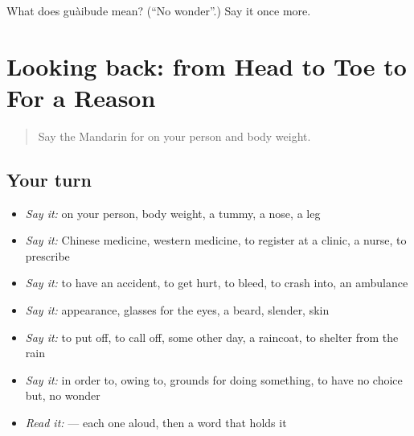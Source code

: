 \begin{tcolorbox}[breakable,colback=teal!4,colframe=teal!35!black,title={Before you move on}]
What does guàibude mean? (\textquotedblleft{}No wonder\textquotedblright{}.) Say it once more.
\end{tcolorbox}
\section[(dialogue)]{Looking back: from Head to Toe to For a Reason}

\label{lesson:ZH-R235-review-230-235}



\begin{quote}
Say the Mandarin for on your person and body weight.
\end{quote}

\subsection*{Your turn}
\begin{itemize}
\raggedright
  \item \emph{Say it:} on your person, body weight, a tummy, a nose, a leg
  \item \emph{Say it:} Chinese medicine, western medicine, to register at a clinic, a nurse, to prescribe
  \item \emph{Say it:} to have an accident, to get hurt, to bleed, to crash into, an ambulance
  \item \emph{Say it:} appearance, glasses for the eyes, a beard, slender, skin
  \item \emph{Say it:} to put off, to call off, some other day, a raincoat, to shelter from the rain
  \item \emph{Say it:} in order to, owing to, grounds for doing something, to have no choice but, no wonder
  \item \emph{Read it:}     — each one aloud, then a word that holds it
\end{itemize}

